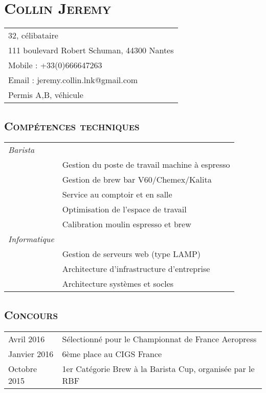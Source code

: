 \documentclass[a4paper]{article}
\newcommand{\hsection}[1]{\section*{\fontfamily{phv}\selectfont\textsc{#1}}}
\newcommand{\hsubsection}[1]{\subsection*{\fontfamily{phv}\selectfont\textsc{#1}}}
\begin{document}
\selectfont
\hsection{Collin Jeremy}
\begin{tabular}{p{16.5cm}}
\hline
32, célibataire\\
111 boulevard Robert Schuman, 44300 Nantes\\
Mobile : +33(0)666647263\\
Email : jeremy.collin.lnk@gmail.com\\
Permis A,B, véhicule\\
\end{tabular}
\hsubsection{Compétences techniques}
\begin{tabular}{P{3.5cm}|p{13cm}}
\textsl{Barista}	&  \\
 & Gestion du poste de travail machine à espresso\\
 & Gestion de brew bar V60/Chemex/Kalita\\
 & Service au comptoir et en salle\\
 & Optimisation de l’espace de travail\\
 & Calibration moulin espresso et brew\\

\textsl{Informatique} & \\
 & Gestion de serveurs web (type LAMP)\\
 & Architecture d’infrastructure d’entreprise \\
 & Architecture systèmes et socles\\
\end{tabular}

\hsubsection{Concours}
\begin{tabular}{P{3.5cm}|p{13cm}}
Avril 2016	& Sélectionné pour le Championnat de France Aeropress\\
Janvier 2016	& 6ème place au CIGS France\\
Octobre 2015	& 1er Catégorie Brew à la Barista Cup, organisée par le RBF\\
\end{tabular}
\end{document}
